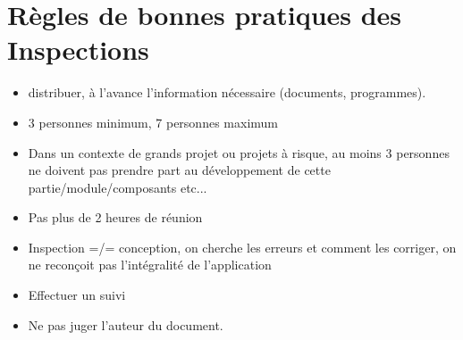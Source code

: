 \section{Règles de bonnes pratiques des Inspections}

\begin{itemize}
\item distribuer, à l'avance l'information nécessaire (documents, programmes).
\item 3 personnes minimum, 7 personnes maximum
\item Dans un contexte de grands projet ou projets à risque, au moins 3 personnes ne doivent pas prendre part au développement de cette partie/module/composants etc...
\item Pas plus de 2 heures de réunion
\item Inspection =/= conception, on cherche les erreurs et comment les corriger, on ne reconçoit pas l’intégralité de l’application
\item Effectuer un suivi
\item Ne pas juger l’auteur du document.
\end{itemize}
